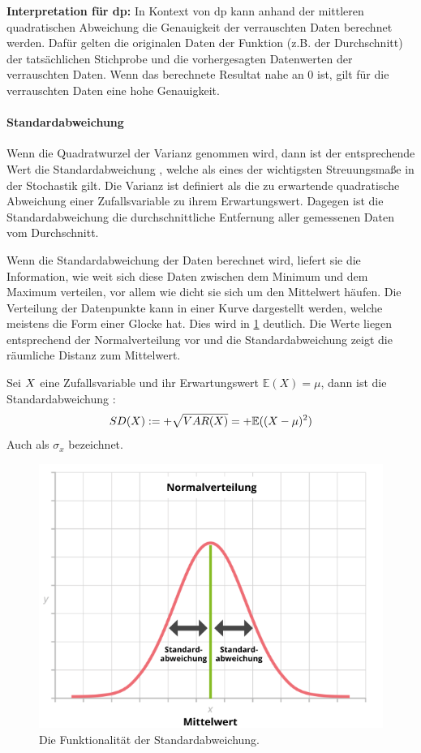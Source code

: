 \textbf{Interpretation für \gls{dp}: }
In Kontext von \gls{dp} kann anhand der mittleren quadratischen Abweichung die Genauigkeit der verrauschten Daten berechnet werden. Dafür gelten die originalen Daten der Funktion (z.B. der Durchschnitt) der tatsächlichen Stichprobe und die vorhergesagten Datenwerten der verrauschten Daten. Wenn das berechnete Resultat nahe an $0$ ist, gilt für die verrauschten Daten eine hohe Genauigkeit.

\paragraph{Standardabweichung}
Wenn die Quadratwurzel der Varianz genommen wird, dann ist der entsprechende Wert die Standardabweichung \parencite{SDLexikon} , welche als eines der wichtigsten Streuungsmaße in der Stochastik gilt.
Die Varianz ist definiert als die zu erwartende quadratische Abweichung einer Zufallsvariable zu ihrem Erwartungswert. Dagegen ist die Standardabweichung die durchschnittliche Entfernung aller gemessenen Daten vom Durchschnitt.

Wenn die Standardabweichung \parencite{SDNormalverteilung} der Daten berechnet wird, liefert sie die Information, wie weit sich diese Daten zwischen dem Minimum und dem Maximum verteilen, vor allem wie dicht sie sich um den Mittelwert häufen. Die Verteilung der Datenpunkte kann in einer Kurve dargestellt werden, welche meistens die Form einer Glocke hat. Dies wird in \cref{fig:nv_std} deutlich. Die Werte liegen entsprechend der Normalverteilung vor und die Standardabweichung zeigt die räumliche Distanz zum Mittelwert.

Sei $X$ eine Zufallsvariable und ihr Erwartungswert $\mathbb{E}(X)=\mu$, dann ist die Standardabweichung \parencite{Varianz}:
\begin{equation*}
	SD(X) := +\sqrt{VAR(X)} = +\mathbb{E}((X-\mu)^2)
\end{equation*}
Auch als $\sigma_{x}$ bezeichnet.

\begin{figure}[htbp]
	\centering
	\includegraphics[scale=0.7]{./images/standard_deviation.png}
	\caption{Die Funktionalität der Standardabweichung. \parencite{STD}}
	\label{fig:nv_std}
\end{figure}

